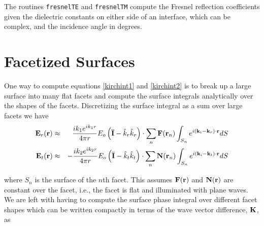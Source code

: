 The routines \texttt{fresnelTE} and \texttt{fresnelTM} compute the Fresnel reflection coefficients given the dielectric constants on either side of an interface, which can be complex, and the incidence angle in degrees.

{\footnotesize
{}
}

{\footnotesize
{}
}


%
%
%

\section{Facetized Surfaces}

One way to compute equations \eqref{kirchint1} and \eqref{kirchint2} is to break up a large surface into many flat facets and compute the surface integrals analytically over the shapes of the facets. Discretizing the surface integral as a sum over large facets we have
\begin{eqnarray}
\mathbf{E}_r(\mathbf{r}) & \approx & \dfrac{ik_1e^{ik_1r}}{4\pi r} E_o \left( \overline{\mathbf{I}} - \hat{k}_r \hat{k}_r \right)  \cdot \sum_n \mathbf{F}(\mathbf{r}_n) \int_{S_n} e^{i (\mathbf{k}_i - \mathbf{k}_r) \cdot \mathbf{r}} dS \label{faceter} \\
\mathbf{E}_t(\mathbf{r}) & \approx & -\dfrac{ik_2e^{ik_2r}}{4\pi r} E_o \left( \overline{\mathbf{I}} - \hat{k}_t \hat{k}_t \right)  \cdot \sum_n \mathbf{N}(\mathbf{r}_n) \int_{S_n}  e^{i (\mathbf{k}_i - \mathbf{k}_t) \cdot \mathbf{r}} dS  \label{facetet}
\end{eqnarray}

\noindent where $S_n$ is the surface of the $n$th facet.  This assumes $\mathbf{F}(\mathbf{r})$ and $\mathbf{N}(\mathbf{r})$ are constant over the facet, i.e., the facet is flat and illuminated with plane waves. We are left with having to compute the surface phase integral over different facet shapes which can be written compactly in terms of the wave vector difference, $\mathbf{K}$, as

